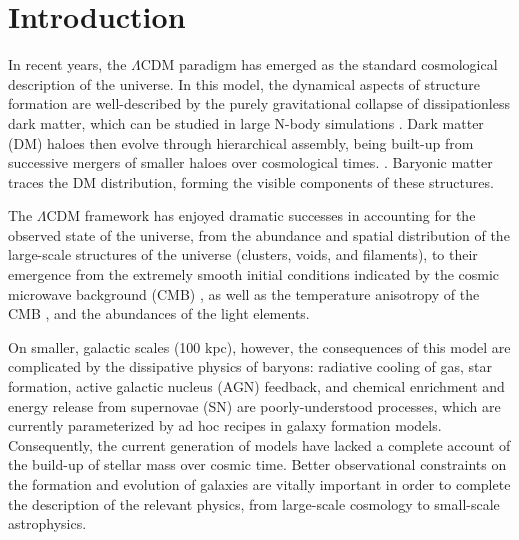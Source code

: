 \chapter{Introduction}

In recent years, the $\Lambda$CDM paradigm has emerged as the standard cosmological description of the universe.
In this model, the dynamical aspects of structure formation are well-described by the purely gravitational collapse of dissipationless dark matter, which can be studied in large N-body simulations \citep[e.g.,][]{Springel:2005aa,Thomas:1992aa,Navarro:1995aa,Weinberg:2004aa}.
Dark matter (DM) haloes then evolve through hierarchical assembly, being built-up from successive mergers of smaller haloes over cosmological times. \citep{Gott:1975ab,Press:1974aa,White:1978aa,Blumenthal:1984aa,Davis:1985aa,White:1991aa,Barnes:1992aa,Cole:2000aa}.
Baryonic matter traces the DM distribution, forming the visible components of these structures.

The $\Lambda$CDM framework has enjoyed dramatic successes in accounting for the observed state of the universe, from the abundance and spatial distribution of the large-scale structures of the universe (clusters, voids, and filaments), to their emergence from the extremely smooth initial conditions indicated by the cosmic microwave background (CMB) \citep{Springel:2006aa}, as well as the temperature anisotropy of the CMB \citep[][and references therein]{Narlikar:2001aa}, and the abundances of the light elements.


On smaller, galactic scales (100 kpc), however, the consequences of this model are complicated by the dissipative physics of baryons:
radiative cooling of gas, star formation, active galactic nucleus (AGN) feedback, and chemical enrichment and energy release from supernovae (SN) are poorly-understood processes, which are currently parameterized by ad hoc recipes in galaxy formation models.
Consequently, the current generation of models have lacked a complete account of the build-up of stellar mass over cosmic time.
Better observational constraints on the formation and evolution of galaxies are vitally important in order to complete the description of the relevant physics, from large-scale cosmology to small-scale astrophysics.

